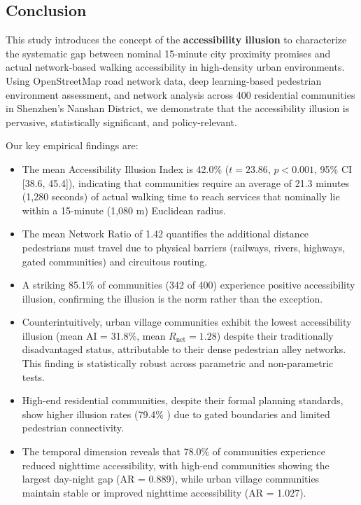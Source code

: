 \documentclass[10pt,conference,compsoc]{IEEEtran}
\begin{document}
\begin{table}[htbp]
\begin{center}
\section{Conclusion}
\label{sec:conclusion}

This study introduces the concept of the \textbf{accessibility illusion} to characterize the systematic gap between nominal 15-minute city proximity promises and actual network-based walking accessibility in high-density urban environments. Using OpenStreetMap road network data, deep learning-based pedestrian environment assessment, and network analysis across 400 residential communities in Shenzhen's Nanshan District, we demonstrate that the accessibility illusion is pervasive, statistically significant, and policy-relevant.

Our key empirical findings are:

\begin{itemize}
    \item The mean Accessibility Illusion Index is 42.0\% ($t = 23.86$, $p < 0.001$, 95\% CI [38.6, 45.4]), indicating that communities require an average of 21.3 minutes (1{,}280 seconds) of actual walking time to reach services that nominally lie within a 15-minute (1{,}080 m) Euclidean radius.
    \item The mean Network Ratio of 1.42 quantifies the additional distance pedestrians must travel due to physical barriers (railways, rivers, highways, gated communities) and circuitous routing.
    \item A striking 85.1\% of communities (342 of 400) experience positive accessibility illusion, confirming the illusion is the norm rather than the exception.
    \item Counterintuitively, urban village communities exhibit the lowest accessibility illusion (mean AI = 31.8\%, mean $R_{\text{net}} = 1.28$) despite their traditionally disadvantaged status, attributable to their dense pedestrian alley networks. This finding is statistically robust across parametric and non-parametric tests.
    \item High-end residential communities, despite their formal planning standards, show higher illusion rates (79.4\% ) due to gated boundaries and limited pedestrian connectivity.
    \item The temporal dimension reveals that 78.0\% of communities experience reduced nighttime accessibility, with high-end communities showing the largest day-night gap (AR = 0.889), while urban village communities maintain stable or improved nighttime accessibility (AR = 1.027).
\end{itemize}


\end{center}
\end{table}
\end{document}
